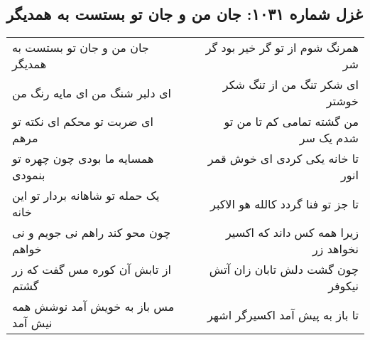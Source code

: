 \begin{center}
\section*{غزل شماره ۱۰۳۱: جان من و جان تو بستست به همدیگر}
\label{sec:1031}
\begin{longtable}{l p{0.5cm} r}
جان من و جان تو بستست به همدیگر
&&
همرنگ شوم از تو گر خیر بود گر شر
\\
ای دلبر شنگ من ای مایه رنگ من
&&
ای شکر تنگ من از تنگ شکر خوشتر
\\
ای ضربت تو محکم ای نکته تو مرهم
&&
من گشته تمامی کم تا من تو شدم یک سر
\\
همسایه ما بودی چون چهره تو بنمودی
&&
تا خانه یکی کردی ای خوش قمر انور
\\
یک حمله تو شاهانه بردار تو این خانه
&&
تا جز تو فنا گردد کالله هو الاکبر
\\
چون محو کند راهم نی جویم و نی خواهم
&&
زیرا همه کس داند که اکسیر نخواهد زر
\\
از تابش آن کوره مس گفت که زر گشتم
&&
چون گشت دلش تابان زان آتش نیکوفر
\\
مس باز به خویش آمد نوشش همه نیش آمد
&&
تا باز به پیش آمد اکسیرگر اشهر
\\
\end{longtable}
\end{center}
